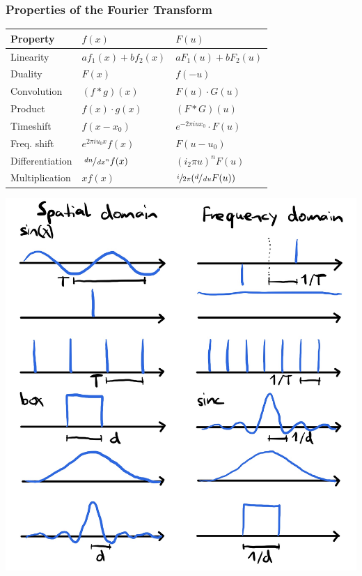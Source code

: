 \documentclass[a4paper,10pt]{article}
\renewcommand*{\arraystretch}{2}
\begin{document}
\subsubsection{Properties of the Fourier Transform}
\begin{center}
    {\renewcommand{\arraystretch}{1.2}
    \begin{tabularx}{\linewidth}{Xll}
	\toprule
	Property & \( f(x) \) & \( F(u) \) \\
	\midrule
	Linearity & \( af_{1}(x) + bf_{2}(x) \) & \( aF_{1}(u) + bF_{2}(u) \) \\
	Duality & \( F(x) \) & \( f(-u) \) \\
	Convolution & \( (f*g)(x) \) & \( F(u) \cdot G(u) \) \\
	Product & \( f(x) \cdot g(x) \) & \( (F*G)(u) \) \\
	Timeshift & \( f(x -x_{0}) \) & \( e^{-2\pi i ux_{0}} \cdot F(u) \) \\
	Freq. shift & \( e^{2\pi i u_{0}x} f(x) \) & \( F(u - u_{0}) \) \\
	Differentiation & \( \sfrac{\mathop{dn}}{\mathop{dx^n}} f(x) \) & \( (i_{2}\pi u)^n F(u) \) \\
	Multiplication & \( xf(x) \) & \( \sfrac{i}{2\pi } (\sfrac{d}{\mathop{du}} F(u)) \) \\
	\bottomrule
    \end{tabularx}
    }
\end{center}
\begin{center}
    \includegraphics[width=\linewidth]{fourier-transforms.jpeg}
\end{center}
\end{document}
